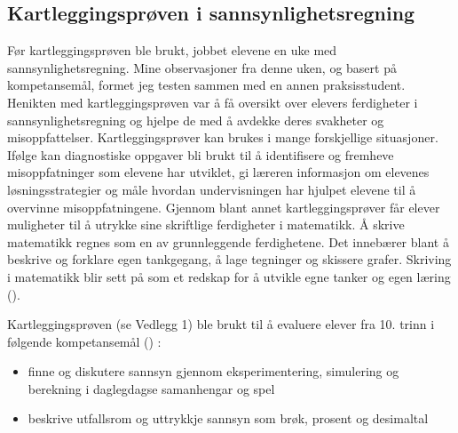 \documentclass[main.tex]{subfiles}
\begin{document}
\subsection*{Kartleggingsprøven i sannsynlighetsregning}
Før kartleggingsprøven ble brukt, jobbet elevene en uke med sannsynlighetsregning. Mine observasjoner fra denne uken, 
og basert på kompetansemål, formet jeg testen sammen med en annen praksisstudent. Henikten med kartleggingsprøven 
var å få oversikt over elevers ferdigheter i sannsynlighetsregning og hjelpe de med å avdekke deres
svakheter og misoppfattelser. Kartleggingsprøver kan brukes i mange forskjellige situasjoner. 
Ifølge  kan diagnostiske oppgaver bli brukt til å identifisere og fremheve misoppfatninger 
som elevene har utviklet, gi læreren informasjon om elevenes løsningsstrategier og måle hvordan undervisningen 
har hjulpet elevene til å overvinne misoppfatningene. Gjennom blant annet kartleggingsprøver får elever muligheter
til å utrykke sine skriftlige ferdigheter i matematikk. Å skrive matematikk regnes som en av grunnleggende 
ferdighetene. Det innebærer blant å beskrive og forklare egen tankgegang, å lage tegninger og skissere grafer. 
Skriving i matematikk blir sett på som et redskap for å utvikle egne tanker og egen læring (). 

Kartleggingsprøven (se Vedlegg 1) ble brukt til å evaluere elever fra 10. trinn i følgende kompetansemål 
() :
\begin{itemize}
\item finne og diskutere sannsyn gjennom eksperimentering, simulering og berekning i daglegdagse samanhengar 
      og spel
\item beskrive utfallsrom og uttrykkje sannsyn som brøk, prosent og desimaltal
\end{itemize}
\end{document}
